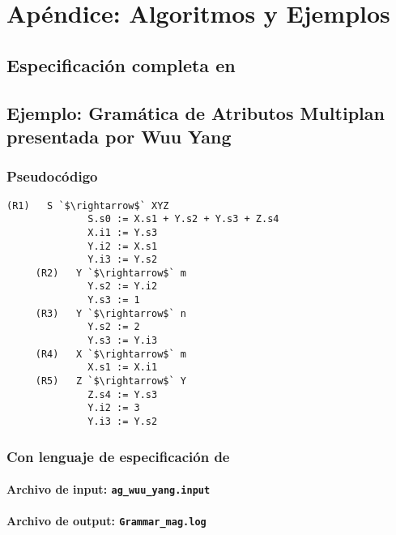 \chapter{Apéndice: Algoritmos y Ejemplos}
\label{chap:appendix}

\section{Especificación completa en \spirit}
\label{append:grammarspirit}



\section{Ejemplo: Gramática de Atributos Multiplan presentada por Wuu Yang}
\label{append:agwuuyang}

\subsection{Pseudocódigo}
\begin{lstlisting}[basicstyle=\scriptsize, backgroundcolor=\color{white}]
     (R1)   S `$\rightarrow$` XYZ      
              S.s0 := X.s1 + Y.s2 + Y.s3 + Z.s4
              X.i1 := Y.s3  
              Y.i2 := X.s1
              Y.i3 := Y.s2
     (R2)   Y `$\rightarrow$` m        
              Y.s2 := Y.i2
              Y.s3 := 1
     (R3)   Y `$\rightarrow$` n        
              Y.s2 := 2
              Y.s3 := Y.i3
     (R4)   X `$\rightarrow$` m        
              X.s1 := X.i1
     (R5)   Z `$\rightarrow$` Y        
              Z.s4 := Y.s3
              Y.i2 := 3
              Y.i3 := Y.s2
\end{lstlisting} 

\subsection{Con lenguaje de especificación de \maggen}

\subsubsection{Archivo de input: \texttt{ag\_wuu\_yang.input}}


\subsubsection{Archivo de output: \texttt{Grammar\_mag.log}}



